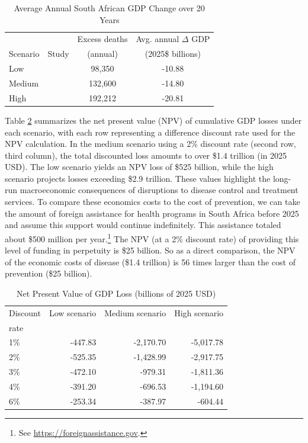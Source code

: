 \documentclass[letterpaper,12pt]{article}
\theoremstyle{definition}
\begin{document}
\begin{spacing}{1.5}
\begin{table}[H] \centering \captionsetup{width=6.0in}
  \caption{\label{tab:avgGDPChange}Average Annual South African GDP Change over 20 Years}
  \begin{tabular}{llcc}
    \hline\hline
             &       & Excess deaths & Avg. annual $\Delta$ GDP \\[-1.5mm]
    \multicolumn{1}{c}{Scenario} & \multicolumn{1}{c}{Study} & (annual) & (2025\$ billions) \\
    \hline\hline
    Low    & \citet{Brink2025}  &  98,350 & -10.88 \\
    Medium & \citet{Gandhi2025} & 132,600 & -14.80 \\
    High   & \citet{KS2025}     & 192,212 & -20.81 \\
    \hline\hline
  \end{tabular}
\end{table}

Table \ref{tab:NPVLosses} summarizes the net present value (NPV) of cumulative GDP losses under each scenario, with each row representing a difference discount rate used for the NPV calculation. In the medium scenario using a 2\% discount rate (second row, third column), the total discounted loss amounts to over \$1.4 trillion (in 2025 USD). The low scenario yields an NPV loss of \$525 billion, while the high scenario projects losses exceeding \$2.9 trillion. These values highlight the long-run macroeconomic consequences of disruptions to disease control and treatment services. To compare these economics costs to the cost of prevention, we can take the amount of foreign assistance for health programs in South Africa before 2025 and assume this support would continue indefinitely. This assistance totaled about \$500 million per year.\footnote{See \href{https://foreignassistance.gov}{https://foreignassistance.gov}.} The NPV (at a 2\% discount rate) of providing this level of funding in perpetuity is \$25 billion. So as a direct comparison, the NPV of the economic costs of disease (\$1.4 trillion) is 56 times larger than the cost of prevention (\$25 billion).

\begin{table}[H] \centering \captionsetup{width=6.0in}
  \caption{\label{tab:NPVLosses}Net Present Value of GDP Loss (billions of 2025 USD)}
  \begin{tabular}{lrrr}
    \hline\hline
    Discount & Low scenario & Medium scenario & High scenario \\[-1.5mm]
    rate & \citet{Brink2025} & \citet{Gandhi2025} & \citet{KS2025} \\
    \hline\hline
    1\% & -447.83 & -2,170.70 & -5,017.78 \\
    2\% & -525.35 & -1,428.99 & -2,917.75 \\
    3\% & -472.10 & -979.31 & -1,811.36 \\
    4\% & -391.20 & -696.53 & -1,194.60 \\
    6\% & -253.34 & -387.97 & -604.44 \\
    \hline\hline
  \end{tabular}
\end{table}


\end{spacing}
\end{document}
